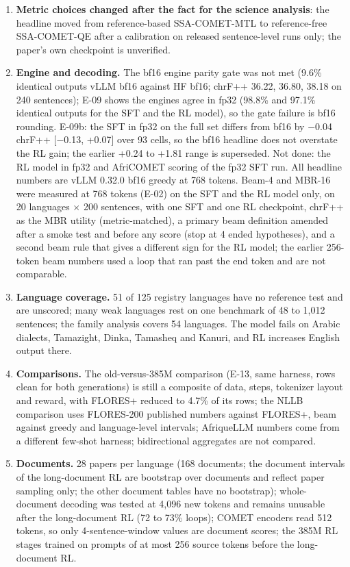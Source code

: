 \begin{enumerate}
\item \textbf{Metric choices changed after the fact for the science analysis}: the headline moved from reference-based SSA-COMET-MTL to reference-free SSA-COMET-QE after a calibration on released sentence-level runs only; the paper's own checkpoint is unverified.
\item \textbf{Engine and decoding.} The bf16 engine parity gate was not met (9.6\% identical outputs vLLM bf16 against HF bf16; chrF++ 36.22, 36.80, 38.18 on 240 sentences); E-09 shows the engines agree in fp32 (98.8\% and 97.1\% identical outputs for the SFT and the RL model), so the gate failure is bf16 rounding. E-09b: the SFT in fp32 on the full set differs from bf16 by \ensuremath{-}0.04 chrF++ [\ensuremath{-}0.13, +0.07] over 93 cells, so the bf16 headline does not overstate the RL gain; the earlier +0.24 to +1.81 range is superseded. Not done: the RL model in fp32 and AfriCOMET scoring of the fp32 SFT run. All headline numbers are vLLM 0.32.0 bf16 greedy at 768 tokens. Beam-4 and MBR-16 were measured at 768 tokens (E-02) on the SFT and the RL model only, on 20 languages $\times$ 200 sentences, with one SFT and one RL checkpoint, chrF++ as the MBR utility (metric-matched), a primary beam definition amended after a smoke test and before any score (stop at 4 ended hypotheses), and a second beam rule that gives a different sign for the RL model; the earlier 256-token beam numbers used a loop that ran past the end token and are not comparable.
\item \textbf{Language coverage.} 51 of 125 registry languages have no reference test and are unscored; many weak languages rest on one benchmark of 48 to 1,012 sentences; the family analysis covers 54 languages. The model fails on Arabic dialects, Tamazight, Dinka, Tamasheq and Kanuri, and RL increases English output there.
\item \textbf{Comparisons.} The old-versus-385M comparison (E-13, same harness, rows clean for both generations) is still a composite of data, steps, tokenizer layout and reward, with FLORES+ reduced to 4.7\% of its rows; the NLLB comparison uses FLORES-200 published numbers against FLORES+, beam against greedy and language-level intervals; AfriqueLLM numbers come from a different few-shot harness; bidirectional aggregates are not compared.
\item \textbf{Documents.} 28 papers per language (168 documents; the document intervals of the long-document RL are bootstrap over documents and reflect paper sampling only; the other document tables have no bootstrap); whole-document decoding was tested at 4,096 new tokens and remains unusable after the long-document RL (72 to 73\% loops); COMET encoders read 512 tokens, so only 4-sentence-window values are document scores; the 385M RL stages trained on prompts of at most 256 source tokens before the long-document RL.

\end{enumerate}
